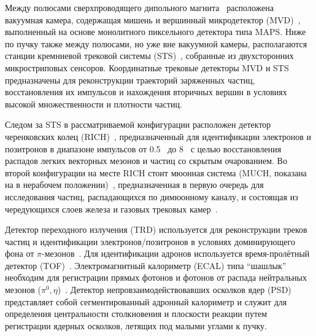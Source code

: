 
Между полюсами сверхпроводящего дипольного магнита~\cite{TDR_Magnet} расположена вакуумная камера, содержащая мишень и вершинный микродетектор (MVD)~\cite{MVD_KOZIEL}, выполненный на основе монолитного пиксельного детектора типа MAPS. Ниже по пучку также между полюсами, но уже вне вакуумной камеры, располагаются станции кремниевой трековой системы (STS)~\cite{TDR_STS}, собранные из двухсторонних микростриповых сенсоров. Координатные трековые детекторы MVD и STS предназначены для реконструкции траекторий заряженных частиц, восстановления их импульсов и нахождения вторичных вершин в условиях высокой множественности и плотности частиц.



Следом за STS в рассматриваемой конфигурации расположен детектор черенковских колец (RICH)~\cite{TDR_RICH}, предназначенный для идентификации электронов и позитронов в диапазоне импульсов от 0.5~\GeVoverC{} до 8~\GeVoverC{} с целью восстановления распадов легких векторных мезонов и частиц со скрытым очарованием. Во второй конфигурации на месте RICH стоит мюонная система (MUCH, показана на  в нерабочем положении)~\cite{TDR_MUCH}, предназначенная в первую очередь для исследования частиц, распадающихся по димюонному каналу, и состоящая из чередующихся слоев железа и газовых трековых камер~\cite{GEM}.

Детектор переходного излучения (TRD) используется для реконструкции треков частиц и идентификации электронов/позитронов в условиях доминирующего фона от $\pi$-мезонов~\cite{TRD}. Для идентификации адронов используется время-пролётный детектор (TOF)~\cite{TDR_TOF}. Электромагнитный калориметр (ECAL) типа ``шашлык'' необходим для регистрации прямых фотонов и фотонов от распада нейтральных мезонов ($ \pi^{0}, \eta $)~\cite{ECAL_KOROLKO}. Детектор непровзаимодействовавших осколков ядер (PSD)~\cite{TDR_PSD} представляет собой сегментированный адронный калориметр и служит для определения центральности столкновения и плоскости реакции путем регистрации ядерных осколков, летящих под малыми углами к пучку.

